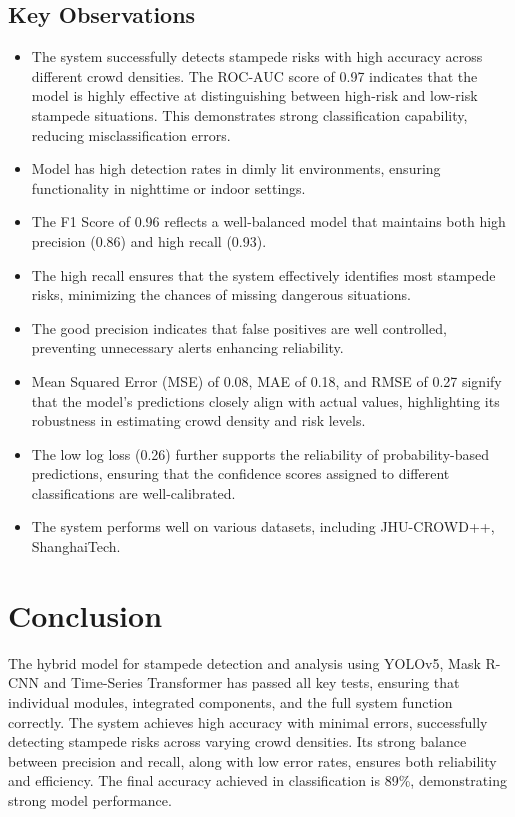\documentclass[11pt]{report}
\begin{document}
\section {Key Observations} 
\begin{itemize}
    \item The system successfully detects stampede risks with high accuracy across different crowd densities. The ROC-AUC score of 0.97 indicates that the model is highly effective at distinguishing between high-risk and low-risk stampede situations. This demonstrates strong classification capability, reducing misclassification errors.
    \item Model has high detection rates in dimly lit environments, ensuring functionality in nighttime or indoor settings.
    \item The F1 Score of 0.96 reflects a well-balanced model that maintains both high precision (0.86) and high recall (0.93).
    \item The high recall ensures that the system effectively identifies most stampede risks, minimizing the chances of missing dangerous situations.
    \item The good precision indicates that false positives are well controlled, preventing unnecessary alerts enhancing reliability.
    \item Mean Squared Error (MSE) of 0.08, MAE of 0.18, and RMSE of 0.27 signify that the model's predictions closely align with actual values, highlighting its robustness in estimating crowd density and risk levels.
    \item The low log loss (0.26) further supports the reliability of probability-based predictions, ensuring that the confidence scores assigned to different classifications are well-calibrated.
    \item The system performs well on various datasets, including JHU-CROWD++, ShanghaiTech.
\end{itemize}

\chapter{Conclusion}
The hybrid model for stampede detection and analysis using YOLOv5, Mask R-CNN and Time-Series Transformer has passed all key tests, ensuring that individual modules, integrated components, and the full system function correctly. The system achieves high accuracy with minimal errors, successfully detecting stampede risks across varying crowd densities. Its strong balance between precision and recall, along with low error rates, ensures both reliability and efficiency. The final accuracy achieved in classification is 89\%, demonstrating strong model performance.
\end{document}
